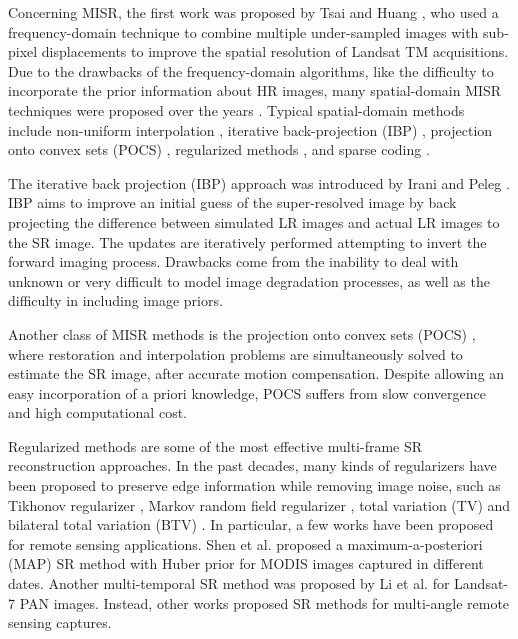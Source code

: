 \documentclass[journal]{IEEEtran}
\begin{document}
Concerning MISR, the first work was proposed by Tsai and Huang \cite{tsaiHuang1984}, who used a frequency-domain technique to combine multiple under-sampled images with sub-pixel displacements to improve the spatial resolution of Landsat TM acquisitions. 
Due to the drawbacks of the frequency-domain algorithms, like the difficulty to incorporate the prior information about HR images, many spatial-domain MISR techniques were proposed over the years \cite{935034}.
Typical spatial-domain methods include non-uniform interpolation \cite{1176931}, iterative back-projection (IBP) \cite{IRANI1991231}, projection onto convex sets (POCS) \cite{Stark:89,413332}, regularized methods \cite{1331445,4060955,shen2009}, and sparse coding \cite{Kato:2017:DSM:3066426.3066466, KATO201564}.


The iterative back projection (IBP) approach was introduced by Irani and Peleg \cite{IRANI1991231}. IBP aims to improve an initial guess of the super-resolved image by back projecting the difference between simulated LR images and actual LR images to the SR image. The updates are iteratively performed attempting to invert the forward imaging process. Drawbacks come from the inability to deal with  unknown or very difficult to model image degradation processes, as well as the difficulty in including image priors. 

Another class of MISR methods is the projection onto convex sets (POCS) \cite{Stark:89,413332}, where restoration and interpolation problems are simultaneously solved to estimate the SR image, after accurate motion compensation. 
Despite allowing an easy incorporation of a priori knowledge, POCS suffers from slow convergence and high computational cost.



Regularized methods are some of the most effective multi-frame SR reconstruction approaches.
In the past decades, many kinds of regularizers have been proposed to preserve edge information while removing image noise, such as Tikhonov regularizer \cite{Hardie98,913592}, Markov random field regularizer \cite{6096366}, total variation (TV) \cite{661187,Marquina2008,Zhang2014} and  bilateral total variation (BTV) \cite{1331445}.
In particular, a few works have been proposed for remote sensing applications. Shen et al. \cite{shen2009} proposed a maximum-a-posteriori (MAP) SR method with Huber prior for MODIS images captured in different dates. Another multi-temporal SR method was proposed by Li et al.\cite{5308275} for  Landsat-7 PAN images. Instead, other works \cite{6134690,Zhang2014} proposed SR methods for multi-angle remote sensing captures. 
\end{document}
